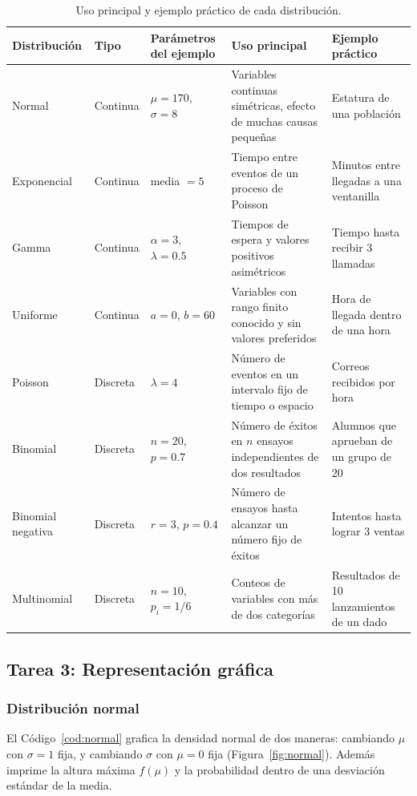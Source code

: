 \documentclass[11pt,letterpaper]{article}
\begin{document}
\begin{table}[htbp]
\centering
\caption{Uso principal y ejemplo práctico de cada distribución.}
\label{tab:comparativa}
\small
\renewcommand{\arraystretch}{1.3}
\begin{tabular}{lllp{4.2cm}p{4.2cm}}
\hline
\textbf{Distribución} & \textbf{Tipo} & \textbf{Parámetros del ejemplo} & \textbf{Uso principal} & \textbf{Ejemplo práctico} \\
\hline
Normal & Continua & $\mu = 170$, $\sigma = 8$ & Variables continuas simétricas, efecto de muchas causas pequeñas & Estatura de una población \\
Exponencial & Continua & media $= 5$ & Tiempo entre eventos de un proceso de Poisson & Minutos entre llegadas a una ventanilla \\
Gamma & Continua & $\alpha = 3$, $\lambda = 0.5$ & Tiempos de espera y valores positivos asimétricos & Tiempo hasta recibir 3 llamadas \\
Uniforme & Continua & $a = 0$, $b = 60$ & Variables con rango finito conocido y sin valores preferidos & Hora de llegada dentro de una hora \\
Poisson & Discreta & $\lambda = 4$ & Número de eventos en un intervalo fijo de tiempo o espacio & Correos recibidos por hora \\
Binomial & Discreta & $n = 20$, $p = 0.7$ & Número de éxitos en $n$ ensayos independientes de dos resultados & Alumnos que aprueban de un grupo de 20 \\
Binomial negativa & Discreta & $r = 3$, $p = 0.4$ & Número de ensayos hasta alcanzar un número fijo de éxitos & Intentos hasta lograr 3 ventas \\
Multinomial & Discreta & $n = 10$, $p_i = 1/6$ & Conteos de variables con más de dos categorías & Resultados de 10 lanzamientos de un dado \\
\hline
\end{tabular}
\end{table}

\subsection{Tarea 3: Representación gráfica}

\subsubsection{Distribución normal}

El Código~\ref{cod:normal} grafica la densidad normal de dos maneras: cambiando $\mu$ con $\sigma = 1$ fija, y cambiando $\sigma$ con $\mu = 0$ fija (Figura~\ref{fig:normal}). Además imprime la altura máxima $f(\mu)$ y la probabilidad dentro de una desviación estándar de la media.
\end{document}
